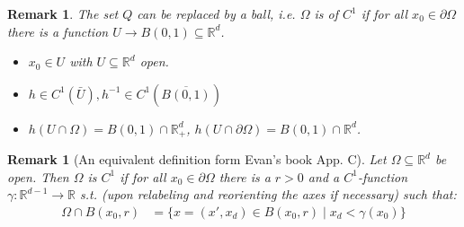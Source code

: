 \documentclass{report}
\theoremstyle{tommy}
\newtheorem{rem}[defn]{Remark}
\begin{document}
  \begin{rem}
    The set \(Q\) can be replaced by a ball, i.e. \(\Omega\) is of \(C^1\) if for all \(x_0 \in \partial \Omega\) there is a function \(U \to B(0,1) \subseteq \mathbb{R}^d\).
    \begin{itemize}
      \item \(x_0 \in U\) with \(U \subseteq \mathbb{R}^d\) open.
      \item \(h \in C^1(\bar U), h^{-1} \in C^1(\overline{B(0,1)})\)
      \item \(h(U \cap \Omega) = B(0,1) \cap \mathbb{R}_+^d\), \(h(U \cap \partial \Omega) = B(0,1) \cap \mathbb{R}^d\).
    \end{itemize}
  \end{rem}

  \begin{rem}[An equivalent definition form Evan's book App. C]
    Let \(\Omega \subseteq \mathbb{R}^d\) be open. Then \(\Omega\) is \(C^1\) if for all \(x_0 \in \partial \Omega\) there is a \(r > 0\) and a \(C^1\)-function \(\gamma: \mathbb{R}^{d-1} \to \mathbb{R}\) s.t. (upon relabeling and reorienting the axes if necessary) such that:
    \begin{align*}
      \Omega \cap B(x_0, r) &= \{x = (x', x_d) \in B(x_0, r) \mid x_d < \gamma(x_0)\}
    \end{align*}
  \end{rem}
\end{document}

